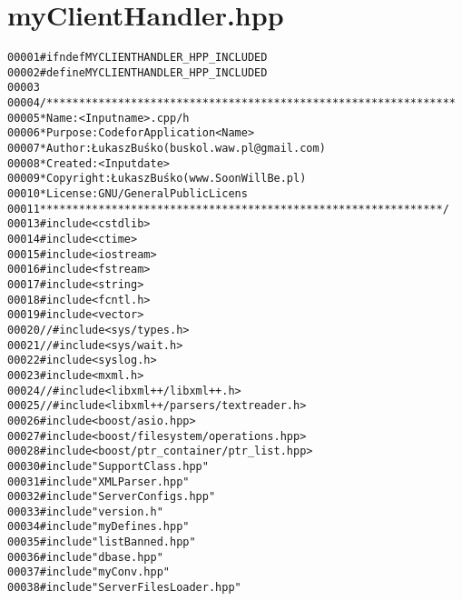 \hypertarget{myClientHandler_8hpp_source}{
\section{myClientHandler.hpp}
}


\begin{footnotesize}\begin{alltt}
00001 \textcolor{preprocessor}{#ifndef MYCLIENTHANDLER\_HPP\_INCLUDED}
00002 \textcolor{preprocessor}{}\textcolor{preprocessor}{#define MYCLIENTHANDLER\_HPP\_INCLUDED}
00003 \textcolor{preprocessor}{}
00004 \textcolor{comment}{/***************************************************************}
00005 \textcolor{comment}{ * Name:      <Input name>.cpp/h}
00006 \textcolor{comment}{ * Purpose:   Code for Application <Name>}
00007 \textcolor{comment}{ * Author:    Łukasz Buśko (buskol.waw.pl@gmail.com)}
00008 \textcolor{comment}{ * Created:   <Input date>}
00009 \textcolor{comment}{ * Copyright: Łukasz Buśko (www.SoonWillBe.pl)}
00010 \textcolor{comment}{ * License:   GNU / General Public Licens}
00011 \textcolor{comment}{ **************************************************************/}
00013 \textcolor{preprocessor}{#include <cstdlib>}
00014 \textcolor{preprocessor}{#include <ctime>}
00015 \textcolor{preprocessor}{#include <iostream>}
00016 \textcolor{preprocessor}{#include <fstream>}
00017 \textcolor{preprocessor}{#include <string>}
00018 \textcolor{preprocessor}{#include <fcntl.h>}
00019 \textcolor{preprocessor}{#include <vector>}
00020 \textcolor{comment}{//#include <sys/types.h>}
00021 \textcolor{comment}{//#include <sys/wait.h>}
00022 \textcolor{preprocessor}{#include <syslog.h>}
00023 \textcolor{preprocessor}{#include <mxml.h>}
00024 \textcolor{comment}{//#include <libxml++/libxml++.h>}
00025 \textcolor{comment}{//#include <libxml++/parsers/textreader.h>}
00026 \textcolor{preprocessor}{#include <boost/asio.hpp>}
00027 \textcolor{preprocessor}{#include <boost/filesystem/operations.hpp>}
00028 \textcolor{preprocessor}{#include <boost/ptr\_container/ptr\_list.hpp>}
00030 \textcolor{preprocessor}{#include "SupportClass.hpp"}
00031 \textcolor{preprocessor}{#include "XMLParser.hpp"}
00032 \textcolor{preprocessor}{#include "ServerConfigs.hpp"}
00033 \textcolor{preprocessor}{#include "version.h"}
00034 \textcolor{preprocessor}{#include "myDefines.hpp"}
00035 \textcolor{preprocessor}{#include "listBanned.hpp"}
00036 \textcolor{preprocessor}{#include "dbase.hpp"}
00037 \textcolor{preprocessor}{#include "myConv.hpp"}
00038 \textcolor{preprocessor}{#include "ServerFilesLoader.hpp"}

\end{alltt}
\end{footnotesize}
